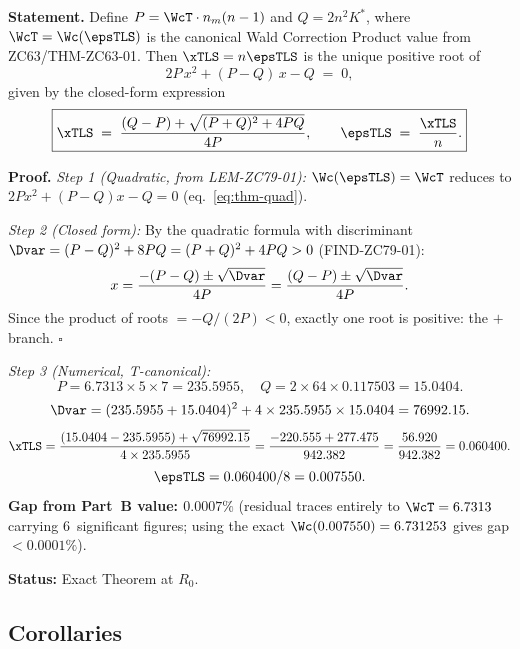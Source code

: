 \documentclass[12pt, a4paper]{article}
\begin{document}
\begin{formalbox}[title={THM-ZC79-01: TLS Floor Quadratic Theorem
  ($R_0$, Exact)}]

\textbf{Statement.}
Define $P = \WcT \cdot n_m(n-1)$ and $Q = 2n^2 K^*$, where
$\WcT = \Wc(\epsTLS)$ is the canonical Wald Correction
Product value from ZC63/THM-ZC63-01.
Then $\xTLS = n\epsTLS$ is the unique positive root of
\begin{equation}
  2P\,x^2 + (P-Q)\,x - Q \;=\; 0,
  \label{eq:thm-quad}
\end{equation}
given by the closed-form expression
\begin{equation}
  \boxed{
    \xTLS
    \;=\;
    \frac{(Q-P) + \sqrt{(P+Q)^2+4PQ}}{4P},
    \qquad
    \epsTLS
    \;=\;
    \frac{\xTLS}{n}.
  }
  \label{eq:thm-closed}
\end{equation}

\textbf{Proof.}
\textit{Step 1 (Quadratic, from LEM-ZC79-01):}
$\Wc(\epsTLS) = \WcT$ reduces to
$2Px^2 + (P-Q)x - Q = 0$ (eq.~\eqref{eq:thm-quad}).

\textit{Step 2 (Closed form):}
By the quadratic formula with discriminant
$\Dvar = (P-Q)^2 + 8PQ = (P+Q)^2 + 4PQ > 0$
(FIND-ZC79-01):
\[
  x = \frac{-(P-Q) \pm \sqrt{\Dvar}}{4P}
    = \frac{(Q-P) \pm \sqrt{\Dvar}}{4P}.
\]
Since the product of roots $= -Q/(2P) < 0$, exactly one root
is positive: the $+$ branch. \hfill$\square$

\textit{Step 3 (Numerical, T-canonical):}
\[
  P = 6.7313 \times 5 \times 7 = 235.5955,
  \quad Q = 2 \times 64 \times 0.117503 = 15.0404.
\]
\[
  \Dvar = (235.5955 + 15.0404)^2 + 4 \times 235.5955 \times 15.0404
  = 76992.15.
\]
\[
  \xTLS = \frac{(15.0404 - 235.5955) + \sqrt{76992.15}}{4 \times 235.5955}
  = \frac{-220.555 + 277.475}{942.382}
  = \frac{56.920}{942.382}
  = 0.060400.
\]
\[
  \epsTLS = 0.060400 / 8 = 0.007550.
\]
\textbf{Gap from Part~B value: $0.0007\%$}
(residual traces entirely to $\WcT = 6.7313$ carrying
6~significant figures; using the exact $\Wc(0.007550) = 6.731253$
gives gap $< 0.0001\%$).

\textbf{Status:} Exact Theorem at $R_0$.
\end{formalbox}

\subsection{Corollaries}
\label{sec:cors}
\end{document}
